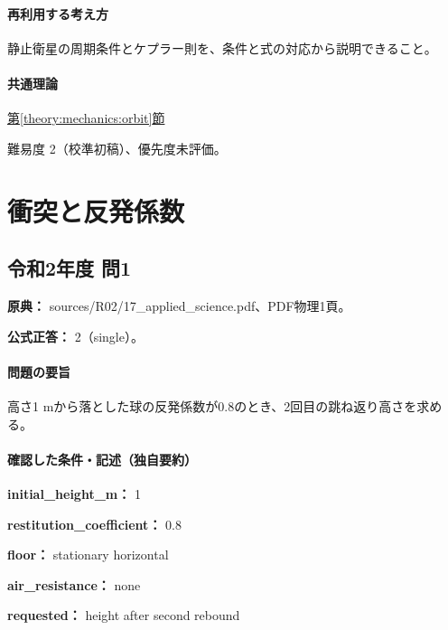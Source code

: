 \paragraph{再利用する考え方} 静止衛星の周期条件とケプラー則を、条件と式の対応から説明できること。

\paragraph{共通理論} \hyperref[theory:mechanics:orbit]{第\ref*{theory:mechanics:orbit}節}

\par 難易度 2（校準初稿）、優先度未評価。

\section{衝突と反発係数}

\subsection{令和2年度 問1}
\label{q:r02-reg-applied-01}

\noindent\textbf{原典：} sources/R02/17\_applied\_science.pdf、PDF物理1頁。

\textbf{公式正答：} 2（single）。

\paragraph{問題の要旨} 高さ1 mから落とした球の反発係数が0.8のとき、2回目の跳ね返り高さを求める。

\paragraph{確認した条件・記述（独自要約）}\mbox{}\par

\noindent\textbf{initial\_height\_m：} 1\par

\noindent\textbf{restitution\_coefficient：} 0.8\par

\noindent\textbf{floor：} stationary horizontal\par

\noindent\textbf{air\_resistance：} none\par

\noindent\textbf{requested：} height after second rebound\par

